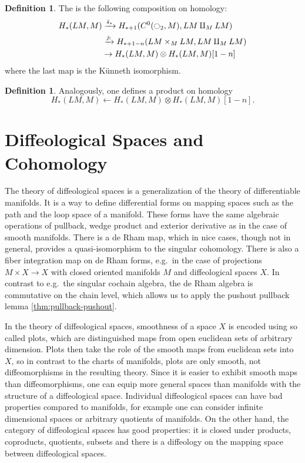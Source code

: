 \documentclass{scrartcl}
\let\emph\relax
\theoremstyle{plain}
\theoremstyle{definition}
\newtheorem{definition}[theorem]{Definition}
\newcommand{\from}{\leftarrow}
\let\xto\xrightarrow
\renewcommand{\coprod}{\mathbin{\amalg}}
\begin{document}
\begin{definition} 
    The \emph{Loop Coproduct} is the following composition on homology:
    \begin{align*}
        H_*(LM, M) &\xto{\tilde s_*} H_{*+1}( C^0(\ocircle_2, M), LM\coprod_M LM) \\ &\xto{j_!} H_{*+1-n}(LM\times_M LM, LM\coprod_M LM) \\ &\to H_{*}(LM, M)\otimes H_*(LM, M)[1-n]
    \end{align*}
    where the last map is the Künneth isomorphism.
\end{definition}

\begin{definition}
Analogously, one defines a product on homology $$H_*(LM, M) \from H_{*}(LM, M)\otimes H_*(LM, M)[1-n].$$
\end{definition}





\section{Diffeological Spaces and Cohomology}\label{sec:diffeological}

The theory of diffeological spaces is a generalization of the theory of differentiable manifolds. It is a way to define differential forms on mapping spaces such as the path and the loop space of a manifold. These forms have the same algebraic operations of pullback, wedge product and exterior derivative as in the case of smooth manifolds. There is a de Rham map, which in nice cases, though not in general, provides a quasi-isomorphism to the singular cohomology. There is also a fiber integration map on de Rham forms, e.g.\ in the case of projections $M\times X\to X$ with closed oriented manifolds $M$ and diffeological spaces $X$. In contrast to e.g.\ the singular cochain algebra, the de Rham algebra is commutative on the chain level, which allows us to apply the pushout pullback lemma \ref{thm:pullback-pushout}. 

In the theory of diffeological spaces, smoothness of a space $X$ is encoded using so called plots, which are distinguished maps from open euclidean sets of arbitrary dimension. Plots then take the role of the smooth maps from euclidean sets into $X$, so in contrast to the charts of manifolds, plots are only smooth, not diffeomorphisms in the resulting theory. Since it is easier to exhibit smooth maps than diffeomorphisms, one can equip more general spaces than manifolds with the structure of a diffeological space. Individual diffeological spaces can have bad properties compared to manifolds, for example one can consider infinite dimensional spaces or arbitrary quotients of manifolds. On the other hand, the category of diffeological spaces has good properties: it is closed under products, coproducts, quotients, subsets and there is a diffeology on the mapping space between diffeological spaces. 
\end{document}
